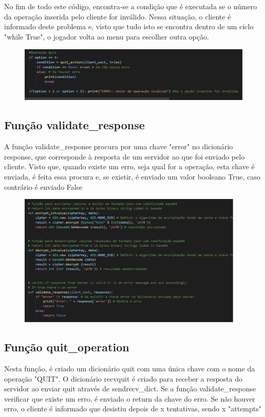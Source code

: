 \documentclass{report}
\begin{document}
No fim de todo este código, encontra-se a condição que é executada se o número da operação inserida pelo cliente for inválido. Nessa situação, o cliente é informado deste problema e, visto que tudo isto se encontra dentro de um ciclo "while True", o jogador volta ao menu para escolher outra opção.

\begin{figure}[!h]
\center
\includegraphics[height = 75pt]{img/option3.png}
\end{figure}
\subsection{Função validate\_response}
\label{ssec:validate}
A função validate\_response procura por uma chave "error" no dicionário response, que corresponde à resposta de um servidor
ao que foi enviado pelo cliente. Visto que, quando existe um erro, seja qual for a operação, esta chave é enviada, é feita essa
procura e, se existir, é enviado um valor booleano True, caso contrário é enviado False

\begin{figure}[!h]
\center
\includegraphics[height = 180pt]{img/cryptovalidate.png}
\end{figure}

\subsection{Função quit\_operation}
\label{ssec:quit}
Nesta função, é criado um dicionário quit com uma única chave com o nome da operação "QUIT". O dicionário recvquit é criado
para receber a resposta do servidor ao enviar quit através de sendrecv\_dict. Se a função validate\_response verificar que existe
um erro, é enviado o return da chave do erro. Se não houver erro, o cliente é informado que desistiu depois de x tentativas,
sendo x "attempts"
\end{document}
